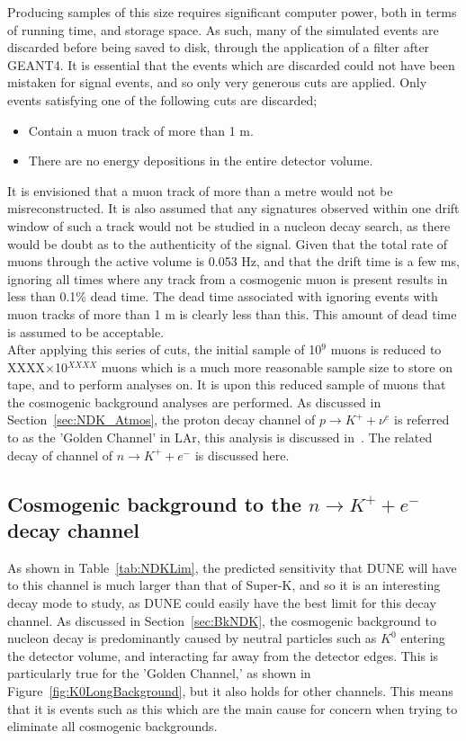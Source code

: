 Producing samples of this size requires significant computer power, both in terms of running time, and storage space. As such, many of the simulated events are discarded before being saved to disk, through the application of a filter after GEANT4. It is essential that the events which are discarded could not have been mistaken for signal events, and so only very generous cuts are applied. Only events satisfying one of the following cuts are discarded;
\begin{itemize}
\item Contain a muon track of more than 1 m.
\item There are no energy depositions in the entire detector volume.
\end{itemize}
It is envisioned that a muon track of more than a metre would not be misreconstructed. It is also assumed that any signatures observed within one drift window of such a track would not be studied in a nucleon decay search, as there would be doubt as to the authenticity of the signal. Given that the total rate of muons through the active volume is 0.053 Hz, and that the drift time is a few ms, ignoring all times where any track from a cosmogenic muon is present results in less than 0.1\% dead time. The dead time associated with ignoring events with muon tracks of more than 1 m is clearly less than this. This amount of dead time is assumed to be acceptable. \\

After applying this series of cuts, the initial sample of 10$^9$ muons is reduced to XXXX$\times$10$^{XXXX}$ muons which is a much more reasonable sample size to store on tape, and to perform analyses on. It is upon this reduced sample of muons that the cosmogenic background analyses are performed. As discussed in Section~\ref{sec:NDK_Atmos}, the proton decay channel of $p \rightarrow K^{+} + \nu^{e}$ is referred to as the 'Golden Channel' in LAr, this analysis is discussed in~\citep{NDKTFNote}. The related decay of channel of $n \rightarrow K^{+} + e^{-}$ is discussed here. \\

\subsection{Cosmogenic background to the $n \rightarrow K^{+} + e^{-}$ decay channel} \label{sec:NDKCosmBk}
As shown in Table~\ref{tab:NDKLim}, the predicted sensitivity that DUNE will have to this channel is much larger than that of Super-K, and so it is an interesting decay mode to study, as DUNE could easily have the best limit for this decay channel. As discussed in Section~\ref{sec:BkNDK}, the cosmogenic background to nucleon decay is predominantly caused by neutral particles such as $K^0$ entering the detector volume, and interacting far away from the detector edges. This is particularly true for the 'Golden Channel,' as shown in Figure~\ref{fig:K0LongBackground}, but it also holds for other channels. This means that it is events such as this which are the main cause for concern when trying to eliminate all cosmogenic backgrounds. \\

